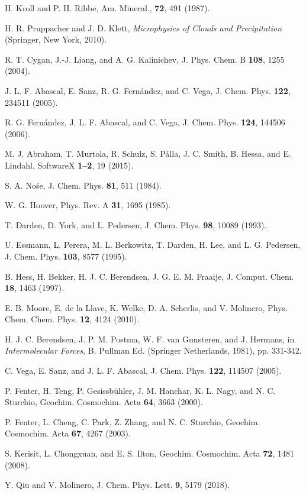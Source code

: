 \documentclass[preprint,aps,prb,floatfix]{revtex4-1}
\begin{document}
\begin{thebibliography}{10}

 H. Kroll and P. H. Ribbe, Am. Mineral., {\bf 72}, 491 (1987).

 H. R. Pruppacher and J. D. Klett, {\it Microphysics of Clouds and Precipitation} (Springer, New York, 2010).

 R. T. Cygan, J.-J. Liang, and A. G. Kalinichev, J. Phys. Chem. B {\bf 108}, 1255 (2004).

 J. L. F. Abascal, E. Sanz, R. G. Fern\'{a}ndez, and C. Vega, J. Chem. Phys. {\bf 122}, 234511 (2005). 

 R. G. Fern\'{a}ndez, J. L. F. Abascal, and C. Vega, J. Chem. Phys. {\bf 124}, 144506 (2006).

 M. J. Abraham, T. Murtola, R. Schulz, S. P\'{a}lla, J. C. Smith, B. Hessa, and E. Lindahl,
SoftwareX {\bf 1–2}, 19 (2015).

 S. A. No\'{s}e, J. Chem. Phys. {\bf 81}, 511 (1984). 

 W. G. Hoover, Phys. Rev. A {\bf 31}, 1695 (1985).

 T. Darden, D. York, and L. Pedersen, J. Chem. Phys. {\bf 98}, 10089 (1993).

 U. Essmann, L. Perera, M. L. Berkowitz, T. Darden, H. Lee, and L. G. Pedersen, J. Chem. Phys. {\bf 103}, 8577 (1995).

 B. Hess, H. Bekker, H. J. C. Berendsen, J. G. E. M. Fraaije, J. Comput. Chem. {\bf 18}, 1463 (1997). 

 E. B. Moore, E. de la Llave, K. Welke, D. A. Scherlis, and V. Molinero, Phys. Chem. Chem. Phys. {\bf 12}, 4124 (2010).

 H. J. C. Berendsen, J. P. M. Postma, W. F. van Gunsteren, and J. Hermans, in {\it Intermolecular Forces}, B. Pullman Ed. (Springer Netherlands, 1981), pp. 331-342.

 C. Vega, E. Sanz, and J. L. F. Abascal, J. Chem. Phys. {\bf 122}, 114507 (2005).


 P. Fenter, H. Teng, P. Gesissb\"{u}hler, J. M. Hanchar, K. L. Nagy, and N. C. Sturchio, Geochim. Cosmochim. Acta {\bf 64}, 3663 (2000). 

 P. Fenter, L. Cheng, C. Park, Z. Zhang, and N. C. Sturchio, Geochim. Cosmochim. Acta {\bf 67}, 4267 (2003). 

 S. Kerisit, L. Chongxuan, and E. S. Ilton, Geochim. Cosmochim. Acta {\bf 72}, 1481 (2008). 

 Y. Qiu and V. Molinero, J. Chem. Phys. Lett. {\bf 9}, 5179 (2018). 

\end{thebibliography}
\end{document}
